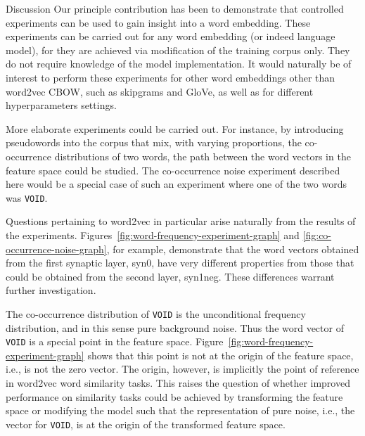 \documentclass{article} %
\newcommand{\word}[1]{\texttt{#1}}
\begin{document}
\begin{section}{Discussion}\label{future-directions}
Our principle contribution has been to demonstrate that controlled
experiments can be used to gain insight into a word embedding.  These
experiments can be carried out for any word embedding (or indeed
language model), for they are achieved via modification of the training
corpus only.  They do not require knowledge of the model implementation.
It would naturally be of interest to perform these experiments for other
word embeddings other than word2vec CBOW, such as skipgrams and GloVe,
as well as for different hyperparameters settings.

More elaborate experiments could be carried out.  For instance, by
introducing pseudowords into the corpus that mix, with varying proportions,
the co-occurrence distributions of two words, the path between the word
vectors in the feature space could be studied.  The co-occurrence noise
experiment described here would be a special case of such an
experiment where one of the two words was \word{VOID}.

Questions pertaining to word2vec in particular arise naturally from the
results of the experiments.
Figures~\ref{fig:word-frequency-experiment-graph} and
\ref{fig:co-occurrence-noise-graph}, for example, demonstrate that the
word vectors obtained from the first synaptic layer, syn0, have very
different properties from those that could be obtained from the second
layer, syn1neg.  These differences warrant further investigation.

The co-occurrence distribution of \word{VOID} is the unconditional
frequency distribution, and in this sense pure background noise.  Thus
the word vector of \word{VOID} is a special point in the feature space.
Figure~\ref{fig:word-frequency-experiment-graph} shows that this point
is not at the origin of the feature space, i.e., is not the zero vector.
The origin, however, is implicitly the point of reference in word2vec
word similarity tasks.  This raises the question of whether improved
performance on similarity tasks could be achieved by transforming the
feature space or modifying the model such that the representation of
pure noise, i.e., the vector for \word{VOID}, is at the origin of the
transformed feature space.
\end{section}

\clearpage
\footnotesize


\end{document}
